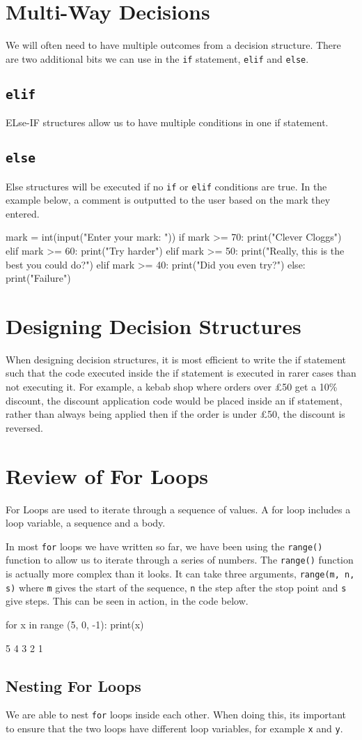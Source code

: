 \section*{Multi-Way Decisions}
We will often need to have multiple outcomes from a decision structure. There are two additional bits we can use in the \texttt{if} statement, \texttt{elif} and \texttt{else}.
\subsection*{\texttt{elif}}
ELse-IF structures allow us to have multiple conditions in one if statement.
\subsection*{\texttt{else}}
Else structures will be executed if no \texttt{if} or \texttt{elif} conditions are true. In the example below, a comment is outputted to the user based on the mark they entered.
\begin{python}
mark = int(input("Enter your mark: "))
if mark >= 70:
    print("Clever Cloggs")
elif mark >= 60:
    print("Try harder")
elif mark >= 50:
    print("Really, this is the best you could do?")
elif mark >= 40:
    print("Did you even try?")
else:
    print("Failure")
\end{python}

\section*{Designing Decision Structures}
When designing decision structures, it is most efficient to write the if statement such that the code executed inside the if statement is executed in rarer cases than not executing it. For example, a kebab shop where orders over £50 get a 10\% discount, the discount application code would be placed inside an if statement, rather than always being applied then if the order is under £50, the discount is reversed.

\section*{Review of For Loops}
For Loops are used to iterate through a sequence of values. A for loop includes a loop variable, a sequence and a body.

In most \texttt{for} loops we have written so far, we have been using the \texttt{range()} function to allow us to iterate through a series of numbers. The \texttt{range()} function is actually more complex than it looks. It can take three arguments, \texttt{range(m, n, s)} where \texttt{m} gives the start of the sequence, \texttt{n} the step after the stop point and \texttt{s} give steps. This can be seen in action, in the code below.
\begin{python}
for x in range (5, 0, -1):
    print(x)
\end{python}
\begin{pseudo*}
5
4
3
2
1
\end{pseudo*}
\subsection*{Nesting For Loops}
We are able to nest \texttt{for} loops inside each other. When doing this, its important to ensure that the two loops have different loop variables, for example \texttt{x} and \texttt{y}.